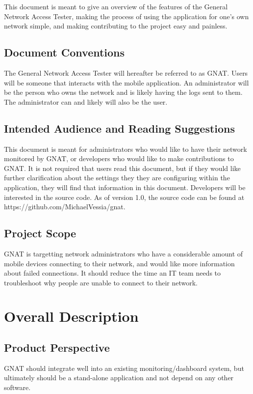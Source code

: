 \documentclass{scrreprt}
\def\version{1.0}
\def\sourcecode{https://github.com/MichaelVessia/gnat}
\begin{document}
This document is meant to give an overview of the features of the General Network Access Tester, making the process of using the application for one's own network simple, and making contributing to the project easy and painless.

\section{Document Conventions}
The General Network Access Tester will hereafter be referred to as GNAT. Users will be someone that interacts with the mobile application.  An administrator will be the person who owns the network and is likely having the logs sent to them.  The administrator can and likely will also be the user.

\section{Intended Audience and Reading Suggestions}
This document is meant for administrators who would like to have their network monitored by GNAT, or developers who would like to make contributions to GNAT. It is not required that users read this document, but if they would like further clarification about the settings they they are configuring within the application, they will find that information in this document.  Developers will be interested in the source code. As of version \version, the source code can be found at \sourcecode.

\section{Project Scope}

GNAT is targetting network administrators who have a considerable amount of mobile devices connecting to their network, and would like more information about failed connections. It should reduce the time an IT team needs to troubleshoot why people are unable to connect to their network.

\chapter{Overall Description}

\section{Product Perspective}

GNAT should integrate well into an existing monitoring/dashboard system, but ultimately should be a stand-alone application and not depend on any other software.
\end{document}
